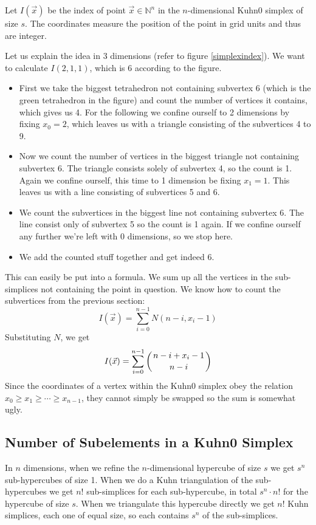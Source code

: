 \documentclass[english,a4paper]{article}
\begin{document}
Let $I(\vec{x})$ be the index of point $\vec{x}\in\mathbb{N}^n$ in the
$n$-dimensional Kuhn0 simplex of size $s$.  The coordinates measure
the position of the point in grid units and thus are integer.

Let us explain the idea in 3 dimensions (refer to figure
\ref{simplexindex}).  We want to calculate $I(2,1,1)$, which is 6
according to the figure.
\begin{itemize}
\item First we take the biggest tetrahedron not containing subvertex 6
  (which is the green tetrahedron in the figure) and count the number
  of vertices it contains, which gives us 4.  For the following we
  confine ourself to 2 dimensions by fixing $x_0=2$, which leaves us
  with a triangle consisting of the subvertices 4 to 9.
\item Now we count the number of vertices in the biggest triangle not
  containing subvertex 6.  The triangle consists solely of subvertex
  4, so the count is 1.  Again we confine ourself, this time to 1
  dimension be fixing $x_1=1$.  This leaves us with a line consisting
  of subvertices 5 and 6.
\item We count the subvertices in the biggest line not containing
  subvertex 6.  The line consist only of subvertex 5 so the count is 1
  again.  If we confine ourself any further we're left with 0
  dimensions, so we stop here.
\item We add the counted stuff together and get indeed 6.
\end{itemize}

This can easily be put into a formula.  We sum up all the vertices in
the sub-simplices not containing the point in question.  We know how to
count the subvertices from the previous section:
\[I(\vec{x})=\sum_{i=0}^{n-1}N(n-i,x_i-1)\]
Substituting $N$, we get
\[I(\vec{x})=\sum_{i=0}^{n-1}\left({n-i+x_i-1}\atop{n-i}\right)\]
Since the coordinates of a vertex within the Kuhn0 simplex obey the
relation $x_0\geq x_1\geq\cdots\geq x_{n-1}$, they cannot simply be
swapped so the sum is somewhat ugly.

\subsection{Number of Subelements in a Kuhn0 Simplex}

In $n$ dimensions, when we refine the $n$-dimensional hypercube of
size $s$ we get $s^n$ sub-hypercubes of size 1.  When we do a Kuhn
triangulation of the sub-hypercubes we get $n!$ sub-simplices for each
sub-hypercube, in total $s^n\cdot n!$ for the hypercube of size $s$.
When we triangulate this hypercube directly we get $n!$ Kuhn
simplices, each one of equal size, so each contains $s^n$ of the
sub-simplices.
\end{document}
